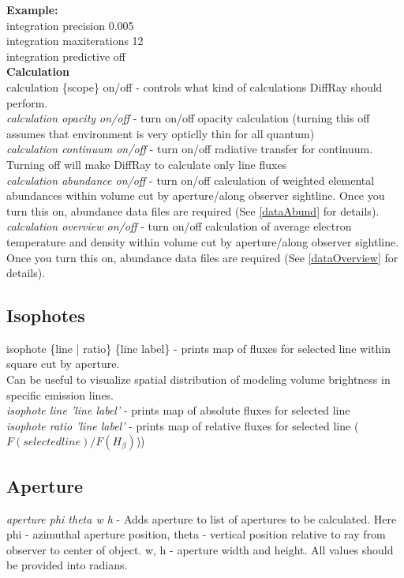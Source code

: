 \documentclass[a4paper]{article}
\begin{document}
{\bf Example:}\\
integration precision 0.005\\
integration maxiterations 12\\
integration predictive off\\

{\bf Calculation}\\
calculation \{scope\} on/off - controls what kind of calculations DiffRay should perform. \\
{\it calculation opacity on/off} - turn on/off opacity calculation (turning this off assumes that environment is very opticlly thin for all
quantum) \\
{\it calculation continuum on/off} - turn on/off radiative transfer for continuum. Turning off will make DiffRay to calculate only line fluxes \\
{\it calculation abundance on/off} - turn on/off calculation of weighted elemental abundances within volume cut by aperture/along observer sightline. Once you turn this on,
abundance data files are required (See \ref{dataAbund} for details). \\
{\it calculation overview on/off} - turn on/off calculation of average electron temperature and density within volume cut by aperture/along observer sightline. Once you turn this on,
abundance data files are required (See \ref{dataOverview} for details). \\

\subsection{Isophotes}
isophote \{line | ratio\} \{line label\} - prints map of fluxes for selected line within square cut by aperture. \\
Can be useful to visualize spatial distribution of modeling volume brightness in specific emission lines. \\
{\it isophote line 'line label'} - prints map of absolute fluxes for selected line \\
{\it isophote ratio 'line label'} - prints map of relative fluxes for selected line ($F(selected line)/F(H_{\beta})$)) \\


\subsection{Aperture}

{\it aperture phi theta w h} - Adds aperture to list of apertures to be calculated.
Here phi - azimuthal aperture position, theta - vertical position relative to ray
from observer to center of object. w, h - aperture width and height. All values
should be provided into radians.\\
\end{document}
